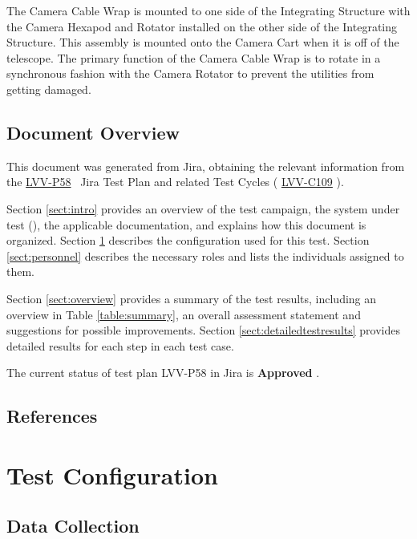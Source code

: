 \documentclass[SE,lsstdraft,STR,toc]{lsstdoc}
\begin{document}
 The Camera Cable Wrap is mounted to one side of the Integrating
Structure with the Camera Hexapod and Rotator installed on the other
side of the Integrating Structure. This assembly is mounted onto the
Camera Cart when it is off of the telescope. The primary function of the
Camera Cable Wrap is to rotate in a synchronous fashion with the Camera
Rotator to prevent the utilities from getting damaged.


\subsection{Document Overview}
\label{sect:docoverview}

This document was generated from Jira, obtaining the relevant information from the 
\href{https://jira.lsstcorp.org/secure/Tests.jspa#/testPlan/LVV-P58}{LVV-P58}
~Jira Test Plan and related Test Cycles (
  \href{https://jira.lsstcorp.org/secure/Tests.jspa#/testCycle/LVV-C109}{LVV-C109}
).

Section \ref{sect:intro} provides an overview of the test campaign, the system under test (\product{}), the applicable documentation, and explains how this document is organized.
Section \ref{sect:configuration}  describes the configuration used for this test.
Section \ref{sect:personnel} describes the necessary roles and lists the individuals assigned to them.

Section \ref{sect:overview} provides a summary of the test results, including an overview in Table \ref{table:summary}, an overall assessment statement and suggestions for possible improvements.
Section \ref{sect:detailedtestresults} provides detailed results for each step in each test case.

The current status of test plan LVV-P58 in Jira is \textbf{ Approved }.

\subsection{References}
\label{sect:references}
\renewcommand{\refname}{}

\section{Test Configuration}
\label{sect:configuration}

\subsection{Data Collection}
\end{document}

